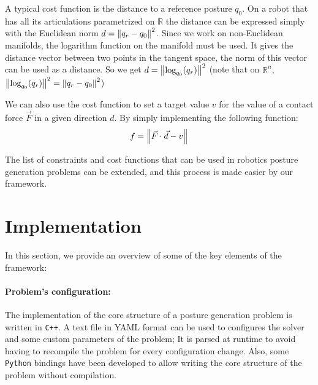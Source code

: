 A typical cost function is the distance to a reference posture $q_0$.
On a robot that has all its articulations parametrized on $\mathbb{R}$ the distance can be expressed simply with the Euclidean norm $d = \left\| q_r-q_0 \right\|^2$.
Since we work on non-Euclidean manifolds, the logarithm function on the manifold must be used.
It gives the distance vector between two points in the tangent space, the norm of this vector can be used as a distance.
So we get $d = \left\| \text{log}_{q_0}(q_r) \right\|^2$ (note that on $\mathbb{R}^n$, $\left\| \text{log}_{q_0}(q_r) \right\|^2 = \left\| q_r - q_0 \right\|^2$)

We can also use the cost function to set a target value $v$ for the value of a contact force $\vec{F}$ in a given direction $d$. By simply implementing the following function:
\begin{equation}
  f = \left\| \vec{F}\cdot\vec{d}-v \right\|
\end{equation}

The list of constraints and cost functions that can be used in robotics posture generation problems can be extended, and this process is made easier by our framework.



\section{Implementation}
\label{sec:implementation}

In this section, we provide an overview of some of the key elements of the framework:

\paragraph{Problem's configuration:}
The implementation of the core structure of a posture generation problem is written in \texttt{C++}.
A text file in YAML format can be used to configures the solver and some custom parameters of the problem; It is parsed at runtime to avoid having to recompile the problem for every configuration change.
Also, some \texttt{Python} bindings have been developed to allow writing the core structure of the problem without compilation.

